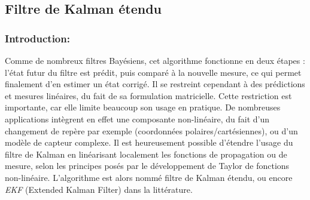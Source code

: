 \subsection{Filtre de Kalman étendu}
\subsubsection{Introduction:}
Comme de nombreux filtres Bayésiens, cet algorithme fonctionne en deux étapes : l'état futur du filtre est prédit, puis comparé à la nouvelle mesure, ce qui permet finalement d'en estimer un état corrigé. Il se restreint cependant à des prédictions et mesures linéaires, du fait de sa formulation matricielle. Cette restriction est importante, car elle limite beaucoup son usage en pratique. De nombreuses applications intègrent en effet une composante non-linéaire, du fait d'un changement de repère par exemple (coordonnées polaires/cartésiennes), ou d'un modèle de capteur complexe. Il est heureusement possible d'étendre l'usage du filtre de Kalman en linéarisant localement les fonctions de propagation ou de mesure, selon les principes posés par le développement de Taylor de fonctions non-linéaire. L'algorithme est alors nommé filtre de Kalman étendu, ou encore \emph{EKF} (Extended Kalman Filter) dans la littérature. 


